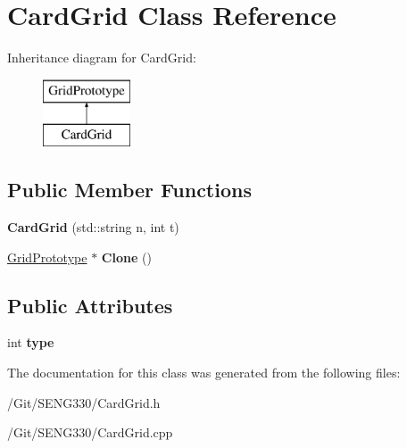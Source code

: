 \hypertarget{class_card_grid}{}\section{Card\+Grid Class Reference}
\label{class_card_grid}
Inheritance diagram for Card\+Grid\+:\begin{figure}[H]
\begin{center}
\leavevmode
\includegraphics[height=2.000000cm]{class_card_grid}
\end{center}
\end{figure}
\subsection*{Public Member Functions}
\begin{DoxyCompactItemize}
\item 
\hypertarget{class_card_grid_a93af955f578a0dd198942485d2730ff6}{}{\bfseries Card\+Grid} (std\+::string n, int t)\label{class_card_grid_a93af955f578a0dd198942485d2730ff6}

\item 
\hypertarget{class_card_grid_ace52db8a7727bab11b122f0a17a97a14}{}\hyperlink{class_grid_prototype}{Grid\+Prototype} $\ast$ {\bfseries Clone} ()\label{class_card_grid_ace52db8a7727bab11b122f0a17a97a14}

\end{DoxyCompactItemize}
\subsection*{Public Attributes}
\begin{DoxyCompactItemize}
\item 
\hypertarget{class_card_grid_a81ecfa016a6c73e1c235c749035e0d71}{}int {\bfseries type}\label{class_card_grid_a81ecfa016a6c73e1c235c749035e0d71}

\end{DoxyCompactItemize}


The documentation for this class was generated from the following files\+:\begin{DoxyCompactItemize}
\item 
/\+Git/\+S\+E\+N\+G330/Card\+Grid.\+h\item 
/\+Git/\+S\+E\+N\+G330/Card\+Grid.\+cpp\end{DoxyCompactItemize}

